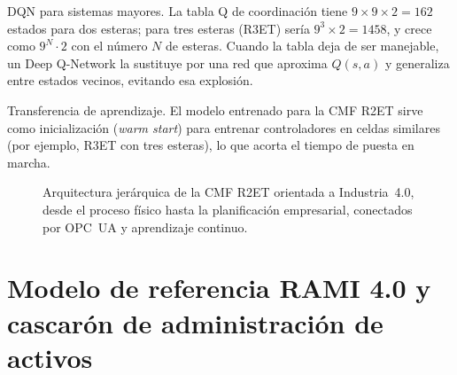 DQN para sistemas mayores. La tabla Q de coordinación tiene $9\times9\times2=162$ estados para dos esteras; para tres esteras (R3ET) sería $9^3\times2=1458$, y crece como $9^N\cdot2$ con el número $N$ de esteras. Cuando la tabla deja de ser manejable, un Deep Q-Network la sustituye por una red que aproxima $Q(s,a)$ y generaliza entre estados vecinos, evitando esa explosión.

Transferencia de aprendizaje. El modelo entrenado para la CMF R2ET sirve como inicialización (\emph{warm start}) para entrenar controladores en celdas similares (por ejemplo, R3ET con tres esteras), lo que acorta el tiempo de puesta en marcha.

\begin{figure}[H]
\centering
{}
\caption{Arquitectura jerárquica de la CMF R2ET orientada a Industria~4.0, desde el proceso físico hasta la planificación empresarial, conectados por OPC~UA y aprendizaje continuo.}
\label{fig:i40_arch}
\end{figure}

\section{Modelo de referencia RAMI 4.0 y cascarón de administración de activos}

